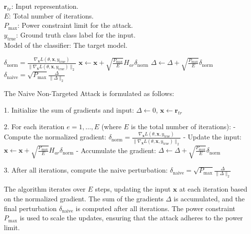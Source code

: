 $\mathbf{r}_{tr}$: Input representation. \\
$E$: Total number of iterations. \\
$P_{\text{max}}$: Power constraint limit for the attack. \\
$y_{\text{true}}$: Ground truth class label for the input. \\
Model of the classifier: The target model.

$\delta_{\text{norm}} = \frac{\nabla_{\mathbf{x}} L(\theta, \mathbf{x}, y_{\text{true}})}{\|\nabla_{\mathbf{x}} L(\theta, \mathbf{x}, y_{\text{true}})\|_2}$
$\mathbf{x} \leftarrow \mathbf{x} + \sqrt{\frac{P_{\text{max}}}{E}} H_{ar} \delta_{\text{norm}}$
$\Delta \leftarrow \Delta + \sqrt{\frac{P_{\text{max}}}{E}} \delta_{\text{norm}}$
$\delta_{\text{naive}} = \sqrt{P_{\text{max}}} \frac{\Delta}{\|\Delta\|_2}$

The Naive Non-Targeted Attack is formulated as follows:

1. Initialize the sum of gradients and input:
   $ \Delta \leftarrow 0 $, $ \mathbf{x} \leftarrow \mathbf{r}_{tr} $

2. For each iteration $ e = 1, \ldots, E $ (where $ E $ is the total number of iterations):
   - Compute the normalized gradient:
     $ \delta_{\text{norm}} = \frac{\nabla_{\mathbf{x}} L(\theta, \mathbf{x}, y_{\text{true}})}{\|\nabla_{\mathbf{x}} L(\theta, \mathbf{x}, y_{\text{true}})\|_2} $
   - Update the input:
     $ \mathbf{x} \leftarrow \mathbf{x} + \sqrt{\frac{P_{\text{max}}}{E}} H_{ar} \delta_{\text{norm}} $
   - Accumulate the gradient:
     $ \Delta \leftarrow \Delta + \sqrt{\frac{P_{\text{max}}}{E}} \delta_{\text{norm}} $

3. After all iterations, compute the naive perturbation:
   $ \delta_{\text{naive}} = \sqrt{P_{\text{max}}} \frac{\Delta}{\|\Delta\|_2} $


The algorithm iterates over $E$ steps, updating the input $ \mathbf{x} $ at each iteration based on the normalized gradient. The sum of the gradients $\Delta$ is accumulated, and the final perturbation $\delta_{\text{naive}}$ is computed after all iterations. The power constraint $P_{\text{max}}$ is used to scale the updates, ensuring that the attack adheres to the power limit.
